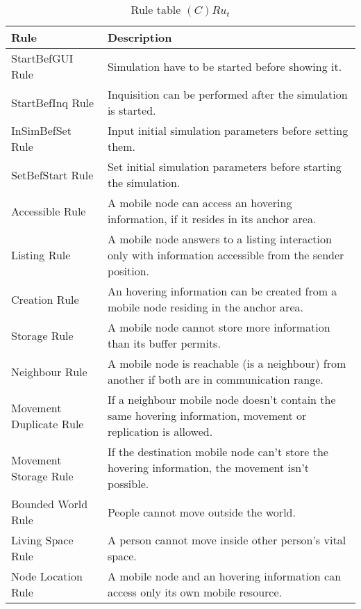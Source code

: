 \begin{table}[H]
	\centering
	\begin{tabular}{|p{4cm}|p{8cm}|}
			\hline
			\textbf{Rule} & \textbf{Description} \\
			\hline
			StartBefGUI Rule & Simulation have to be started before showing it.\\
			\hline
			StartBefInq Rule & Inquisition can be performed after the simulation is
			started.\\
			\hline
			InSimBefSet Rule & Input initial simulation parameters before setting
			them.  \\
			\hline
			SetBefStart Rule & Set initial simulation parameters before starting the
			simulation.  \\
			\hline
			Accessible Rule & A mobile node can access an hovering information, if it
			resides in its anchor area. \\
			\hline
			Listing Rule & A mobile node answers to a listing interaction only with
			information accessible from the sender position. \\
			\hline
			Creation Rule & An hovering information can be created from a mobile node
			residing in the anchor area. \\
			\hline
			Storage Rule & A mobile node cannot store more information than its
			buffer permits. \\
			\hline
			Neighbour Rule & A mobile node is reachable (is a neighbour) from
			another if both are in communication range. \\
			\hline
			Movement Duplicate Rule & If a neighbour mobile node doesn't contain the same
			hovering information, movement or replication is allowed. \\
			\hline
			Movement Storage Rule & If the destination mobile node can't store the hovering
			information, the movement isn't possible. \\
			\hline
			Bounded World Rule & People cannot move outside the world. \\
			\hline
			Living Space Rule & A person cannot move inside other person's vital space. \\
			\hline
			Node Location Rule & A mobile node and an hovering information can access
			only its own mobile resource. \\
			\hline
		\end{tabular}
	\caption{Rule table $(C)Ru_t$}
	\label{tab:crut}
\end{table}

